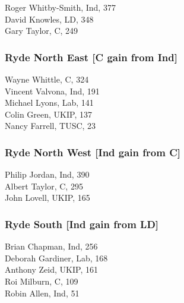 \documentclass[a4paper,openany,10pt]{book}
\begin{document}


Roger Whitby-Smith, Ind, 377\\
David Knowles, LD, 348\\
Gary Taylor, C, 249\\


\subsubsection*{Ryde North East \hspace*{\fill}\nolinebreak[1]%
\enspace\hspace*{\fill}
[C gain from Ind]}



Wayne Whittle, C, 324\\
Vincent Valvona, Ind, 191\\
Michael Lyons, Lab, 141\\
Colin Green, UKIP, 137\\
Nancy Farrell, TUSC, 23\\


\subsubsection*{Ryde North West \hspace*{\fill}\nolinebreak[1]%
\enspace\hspace*{\fill}
[Ind gain from C]}



Philip Jordan, Ind, 390\\
Albert Taylor, C, 295\\
John Lovell, UKIP, 165\\


\subsubsection*{Ryde South \hspace*{\fill}\nolinebreak[1]%
\enspace\hspace*{\fill}
[Ind gain from LD]}



Brian Chapman, Ind, 256\\
Deborah Gardiner, Lab, 168\\
Anthony Zeid, UKIP, 161\\
Roi Milburn, C, 109\\
Robin Allen, Ind, 51\\
\end{document}
